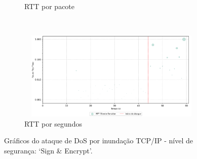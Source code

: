 \begin{apendicesenv}
\begin{figure}[htbp!]
\begin{subfigure}[t]{0.5\textwidth}
        \caption{RTT por pacote}
    \end{subfigure}%
    ~
    \begin{subfigure}[t]{0.5\textwidth}
        \centering
        \includegraphics[width=1\textwidth, height=120pt]{USPSC-img/output/cropped/2-dos_hping3-rtts.png}
        \caption{RTT por segundos}
    \end{subfigure}%
    \label{fig:2-dos_hping3}
    \caption{Gráficos do ataque de DoS por inundação TCP/IP - nível de segurança: `Sign \& Encrypt'.}
\end{figure}


\end{apendicesenv}
